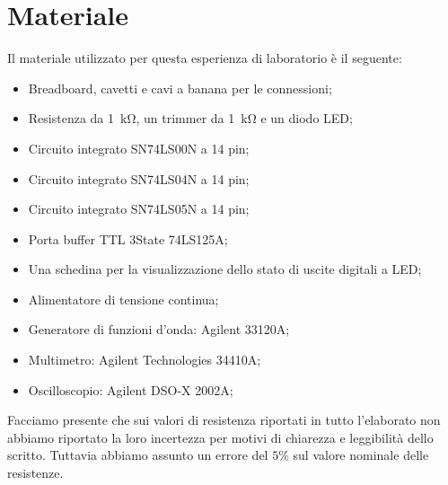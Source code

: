 \section*{Materiale}

Il materiale utilizzato per questa esperienza di laboratorio è il seguente:

\begin{itemize} \itemsep2pt \parskip0pt 
    \item{Breadboard, cavetti e cavi a banana per le connessioni;}
    \item{Resistenza da \SI{1}{\kilo\ohm}, un trimmer da \SI{1}{\kilo\ohm} e un diodo LED;}
    \item{Circuito integrato SN74LS00N a 14 pin;}
    \item{Circuito integrato SN74LS04N a 14 pin;}
	\item{Circuito integrato SN74LS05N a 14 pin;}
	\item{Porta buffer TTL 3State 74LS125A;}
	\item{Una schedina per la visualizzazione dello stato di uscite digitali a LED;}
    \item{Alimentatore di tensione continua;}
    \item{Generatore di funzioni d'onda: Agilent 33120A;}
    \item{Multimetro: Agilent Technologies 34410A;}
    \item{Oscilloscopio: Agilent DSO-X 2002A;}
\end{itemize}

Facciamo presente che sui valori di resistenza riportati in tutto l'elaborato non abbiamo riportato la loro incertezza per motivi di chiarezza e leggibilità dello scritto. Tuttavia abbiamo assunto un errore del $5\%$ sul valore nominale delle resistenze.

